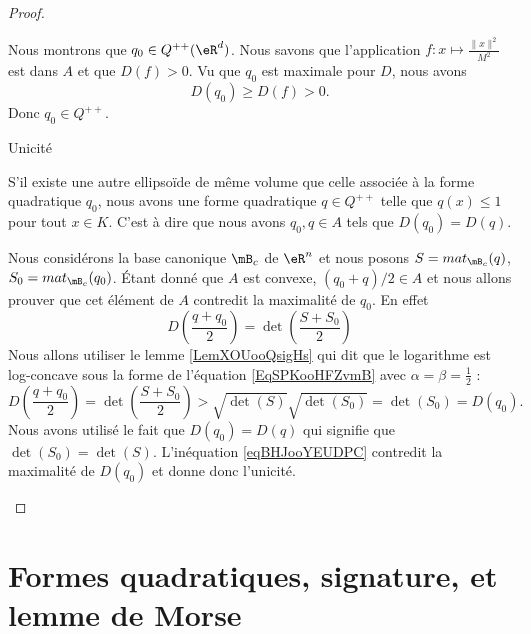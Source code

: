 \begin{proof}
\begin{subproof}
            Nous montrons que \( q_0\in Q^{++}(\eR^d)\). Nous savons que l'application \( f\colon x\mapsto \frac{ \| x \|^2 }{ M^2 }\) est dans \( A\) et que \( D(f)>0\). Vu que \( q_0\) est maximale pour \( D\), nous avons
            \begin{equation}
                D(q_0)\geq D(f)>0.
            \end{equation}
            Donc \( q_0\in Q^{++}\).

        \item[Unicité]

            S'il existe une autre ellipsoïde de même volume que celle associée à la forme quadratique \( q_0\), nous avons une forme quadratique \( q\in Q^{++}\) telle que \( q(x)\leq 1\) pour tout \( x\in K\). C'est à dire que nous avons \( q_0,q\in A\) tels que \( D(q_0)=D(q)\).

            Nous considérons la base canonique \( \mB_c\) de \( \eR^n\) et nous posons \( S=mat_{\mB_c}(q)\), \( S_0=mat_{\mB_c}(q_0)\). Étant donné que \( A\) est convexe, \( (q_0+q)/2\in A\) et nous allons prouver que cet élément de \( A\) contredit la maximalité de \( q_0\). En effet
            \begin{equation}
                D\left( \frac{ q+q_0 }{ 2 }\right)=\det\left( \frac{ S+S_0 }{2} \right)
            \end{equation}
            Nous allons utiliser le lemme \ref{LemXOUooQsigHs} qui dit que le logarithme est log-concave sous la forme de l'équation \eqref{EqSPKooHFZvmB} avec \( \alpha=\beta=\frac{ 1 }{2}\) :
            \begin{equation}    \label{eqBHJooYEUDPC}
                D\left( \frac{ q+q_0 }{ 2 }\right)=\det\left( \frac{ S+S_0 }{2} \right)>\sqrt{\det(S)}\sqrt{\det(S_0)}=\det(S_0)=D(q_0).
            \end{equation}
            Nous avons utilisé le fait que \( D(q_0)=D(q)\) qui signifie que \( \det(S_0)=\det(S)\). L'inéquation \eqref{eqBHJooYEUDPC} contredit la maximalité de \( D(q_0)\) et donne donc l'unicité.
    \end{subproof}
\end{proof}


\section{Formes quadratiques, signature, et lemme de Morse}


